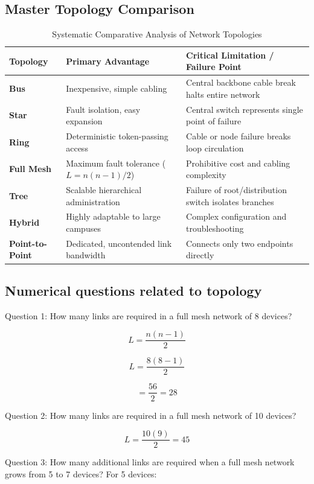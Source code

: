 \subsection{Master Topology Comparison}
\begin{table}[htbp]
\centering
\caption{Systematic Comparative Analysis of Network Topologies}
\label{tab:topology_comparisons}
\begin{tabularx}{\textwidth}{p{3.0cm} X X}
\toprule
\textbf{Topology} & \textbf{Primary Advantage} & \textbf{Critical Limitation / Failure Point} \\
\midrule
\textbf{Bus} & Inexpensive, simple cabling & Central backbone cable break halts entire network \\
\textbf{Star} & Fault isolation, easy expansion & Central switch represents single point of failure \\
\textbf{Ring} & Deterministic token-passing access & Cable or node failure breaks loop circulation \\
\textbf{Full Mesh} & Maximum fault tolerance ($L = n(n-1)/2$) & Prohibitive cost and cabling complexity \\
\textbf{Tree} & Scalable hierarchical administration & Failure of root/distribution switch isolates branches \\
\textbf{Hybrid} & Highly adaptable to large campuses & Complex configuration and troubleshooting \\
\textbf{Point-to-Point} & Dedicated, uncontended link bandwidth & Connects only two endpoints directly \\
\bottomrule
\end{tabularx}
\end{table}
\subsection{Numerical questions related to topology}
Question 1: How many links are required in a full mesh network of 8 devices?

\[
L=\frac{n(n-1)}{2}
\]


\[
L=\frac{8(8-1)}{2}
\]


\[
=\frac{56}{2}=\boxed{28}
\]

Question 2: How many links are required in a full mesh network of 10 devices?

\[
L=\frac{10(9)}{2}=\boxed{45}
\]

Question 3: How many additional links are required when a full mesh network grows from 5 to 7 devices?
For 5 devices:

